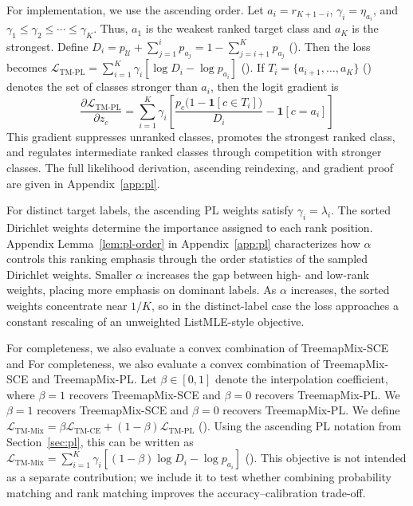 For implementation, we use the ascending order. Let \(a_i=r_{K+1-i}\), \(\gamma_i=\eta_{a_i}\), and \(\gamma_1\le\gamma_2\le\cdots\le\gamma_K\). Thus, $a_1$ is the weakest ranked target class and $a_K$ is the strongest. Define \label{eq:Di}\(D_i=p_{\mathcal U}+\sum_{j=1}^{i}p_{a_j}=1-\sum_{j=i+1}^{K}p_{a_j}\)\textup{ (\theequation)}. Then the loss becomes \label{eq:lm-pl-asc}\(\mathcal{L}_{\mathrm{TM\text{-}PL}}=\sum_{i=1}^{K}\gamma_i\left[\log D_i-\log p_{a_i}\right]\)\textup{ (\theequation)}. If \label{eq:Ti}\(T_i=\{a_{i+1},\dots,a_K\}\)\textup{ (\theequation)} denotes the set of classes stronger than $a_i$, then the logit gradient is
\begin{equation}
\label{eq:lm-pl-grad}
\frac{\partial \mathcal{L}_{\mathrm{TM\text{-}PL}}}{\partial z_c}=\sum_{i=1}^{K}\gamma_i\left[\frac{p_c\bigl(1-\mathbf{1}[c\in T_i]\bigr)}{D_i}-\mathbf{1}[c=a_i]\right]
\end{equation}
This gradient suppresses unranked classes, promotes the strongest ranked class, and regulates intermediate ranked classes through competition with stronger classes. The full likelihood derivation, ascending reindexing, and gradient proof are given in Appendix~\ref{app:pl}.

For distinct target labels, the ascending PL weights satisfy \(\gamma_i=\lambda_i\). The sorted Dirichlet weights determine the importance assigned to each rank position. Appendix Lemma~\ref{lem:pl-order} in Appendix~\ref{app:pl} characterizes how \(\alpha\) controls this ranking emphasis through the order statistics of the sampled Dirichlet weights. Smaller $\alpha$ increases the gap between high- and low-rank weights, placing more emphasis on dominant labels. As $\alpha$ increases, the sorted weights concentrate near $1/K$, so in the distinct-label case the loss approaches a constant rescaling of an unweighted ListMLE-style objective.

For completeness, we also evaluate a convex combination of TreemapMix-SCE and
For completeness, we also evaluate a convex combination of TreemapMix-SCE and
TreemapMix-PL. Let $\beta\in[0,1]$ denote the interpolation coefficient, where
$\beta=1$ recovers TreemapMix-SCE and $\beta=0$ recovers TreemapMix-PL. We
$\beta=1$ recovers TreemapMix-SCE and $\beta=0$ recovers TreemapMix-PL. We
define \label{eq:lm-mix}\(\mathcal{L}_{\mathrm{TM\text{-}Mix}}=\beta\mathcal{L}_{\mathrm{TM\text{-}CE}}+(1-\beta)\mathcal{L}_{\mathrm{TM\text{-}PL}}\)\textup{ (\theequation)}.
Using the ascending PL notation from Section~\ref{sec:pl}, this can be
written as \label{eq:lm-mix-asc}\(\mathcal{L}_{\mathrm{TM\text{-}Mix}}=\sum_{i=1}^{K}\gamma_i\left[(1-\beta)\log D_i-\log p_{a_i}\right]\)\textup{ (\theequation)}.
This objective is not intended as a separate contribution; we
include it to test whether combining probability matching and rank matching
improves the accuracy--calibration trade-off.

